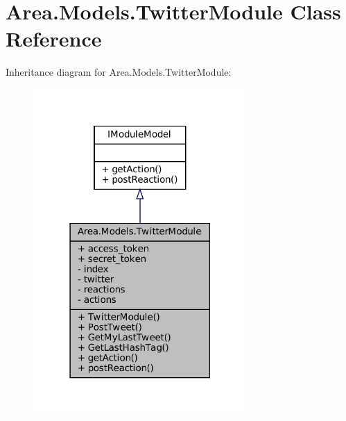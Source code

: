 \hypertarget{classArea_1_1Models_1_1TwitterModule}{}\section{Area.\+Models.\+Twitter\+Module Class Reference}
\label{classArea_1_1Models_1_1TwitterModule}


Inheritance diagram for Area.\+Models.\+Twitter\+Module\+:
\nopagebreak
\begin{figure}[H]
\begin{center}
\leavevmode
\includegraphics[width=231pt]{classArea_1_1Models_1_1TwitterModule__inherit__graph}
\end{center}
\end{figure}


